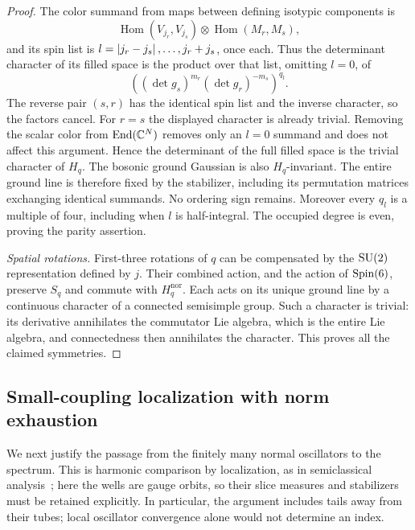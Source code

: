 \begin{proof}
The color summand from maps between defining isotypic components
is
\[
 \operatorname{Hom}(V_{j_r},V_{j_s})
       \otimes\operatorname{Hom}(M_r,M_s),
\]
and its spin list is \(l=\left\lvert j_r-j_s\right\rvert,\ldots,j_r+j_s\), once
each. Thus the determinant character of its filled space is the
product over that list, omitting \(l=0\), of
\begin{equation}
\label{mass:centralizer-character}
 \left((\det g_s)^{m_r}(\det g_r)^{-m_s}\right)^{q_l}.
\end{equation}
The reverse pair \((s,r)\) has the identical spin list and the
inverse character, so the factors cancel. For \(r=s\) the displayed
character is already trivial. Removing the scalar color from
\(\operatorname{End}(\mathbb C^N)\) removes only an \(l=0\) summand and
does not affect this argument. Hence the determinant of the full
filled space is the trivial character of \(H_q\). The bosonic
ground Gaussian is also \(H_q\)-invariant. The entire ground line
is therefore fixed by the stabilizer, including its permutation
matrices exchanging identical summands. No ordering sign remains.
Moreover every \(q_l\) is a multiple of four, including when
\(l\) is half-integral. The occupied degree is even, proving the
parity assertion.

\smallskip\noindent\emph{Spatial rotations.}
First-three rotations of \(q\) can be compensated by the
\(\operatorname{SU}(2)\) representation defined by \(j\). Their combined action,
and the action of \(\operatorname{Spin}(6)\), preserve \(S_q\) and commute with
\(H_q^{\mathrm{nor}}\). Each acts on its unique ground line by a
continuous character of a connected semisimple group. Such a
character is trivial: its derivative annihilates the commutator
Lie algebra, which is the entire Lie algebra, and connectedness
then annihilates the character. This proves all the claimed
symmetries.
\end{proof}

\subsection{Small-coupling localization with norm exhaustion}

We next justify the passage from the finitely many normal
oscillators to the spectrum. This is harmonic comparison by
localization, as in semiclassical analysis~\cite{Simon1983}; here the
wells are gauge orbits, so their slice measures and stabilizers
must be retained explicitly. In particular, the argument includes
tails away from their tubes; local oscillator convergence alone
would not determine an index.


